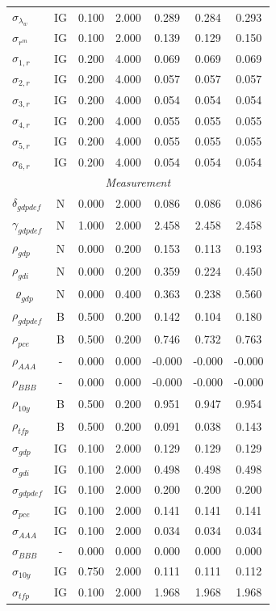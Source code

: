 \documentclass[12pt]{article}
\begin{document}
{\begin{longtable}{lcccccc}
$\sigma_{\lambda_w}$ & IG &    0.100 &    2.000 &    0.289 &    0.284 &    0.293 \\
$\sigma_{r^m}$ & IG &    0.100 &    2.000 &    0.139 &    0.129 &    0.150 \\
$\sigma_{1,r}$ & IG &    0.200 &    4.000 &    0.069 &    0.069 &    0.069 \\
$\sigma_{2,r}$ & IG &    0.200 &    4.000 &    0.057 &    0.057 &    0.057 \\
$\sigma_{3,r}$ & IG &    0.200 &    4.000 &    0.054 &    0.054 &    0.054 \\
$\sigma_{4,r}$ & IG &    0.200 &    4.000 &    0.055 &    0.055 &    0.055 \\
$\sigma_{5,r}$ & IG &    0.200 &    4.000 &    0.055 &    0.055 &    0.055 \\
$\sigma_{6,r}$ & IG &    0.200 &    4.000 &    0.054 &    0.054 &    0.054 \\
\multicolumn{7}{c}{\textit{Measurement}} \\[3pt]
$\delta_{gdpdef}$ & N &    0.000 &    2.000 &    0.086 &    0.086 &    0.086 \\
$\gamma_{gdpdef}$ & N &    1.000 &    2.000 &    2.458 &    2.458 &    2.458 \\
$\rho_{gdp}$ & N &    0.000 &    0.200 &    0.153 &    0.113 &    0.193 \\
$\rho_{gdi}$ & N &    0.000 &    0.200 &    0.359 &    0.224 &    0.450 \\
$\varrho_{gdp}$ & N &    0.000 &    0.400 &    0.363 &    0.238 &    0.560 \\
$\rho_{gdpdef}$ & B &    0.500 &    0.200 &    0.142 &    0.104 &    0.180 \\
$\rho_{pce}$ & B &    0.500 &    0.200 &    0.746 &    0.732 &    0.763 \\
$\rho_{AAA}$ & - &    0.000 &    0.000 &   -0.000 &   -0.000 &   -0.000 \\
$\rho_{BBB}$ & - &    0.000 &    0.000 &   -0.000 &   -0.000 &   -0.000 \\
$\rho_{10y}$ & B &    0.500 &    0.200 &    0.951 &    0.947 &    0.954 \\
$\rho_{tfp}$ & B &    0.500 &    0.200 &    0.091 &    0.038 &    0.143 \\
$\sigma_{gdp}$ & IG &    0.100 &    2.000 &    0.129 &    0.129 &    0.129 \\
$\sigma_{gdi}$ & IG &    0.100 &    2.000 &    0.498 &    0.498 &    0.498 \\
$\sigma_{gdpdef}$ & IG &    0.100 &    2.000 &    0.200 &    0.200 &    0.200 \\
$\sigma_{pce}$ & IG &    0.100 &    2.000 &    0.141 &    0.141 &    0.141 \\
$\sigma_{AAA}$ & IG &    0.100 &    2.000 &    0.034 &    0.034 &    0.034 \\
$\sigma_{BBB}$ & - &    0.000 &    0.000 &    0.000 &    0.000 &    0.000 \\
$\sigma_{10y}$ & IG &    0.750 &    2.000 &    0.111 &    0.111 &    0.112 \\
$\sigma_{tfp}$ & IG &    0.100 &    2.000 &    1.968 &    1.968 &    1.968 \\
\end{longtable}}
\end{document}
